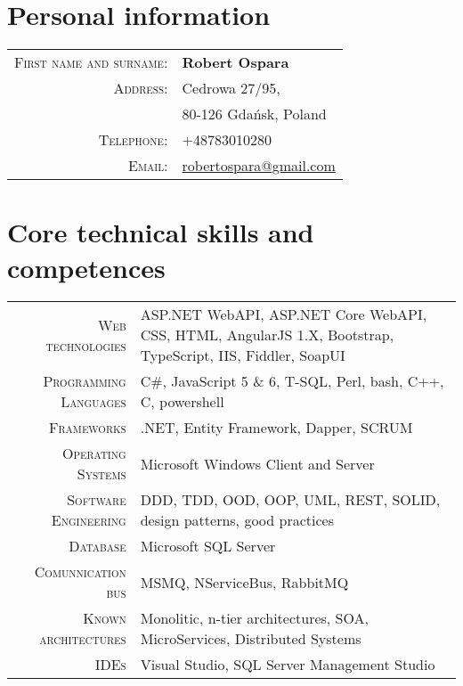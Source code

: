 \documentclass[a4paper,12pt]{article}
\begin{document}
\mbox{}
\par{\bigskip\par}

\section{Personal information}

\begin{tabular}{rl}
	\textsc{First name and surname:}&  \textbf{Robert Ospara} \\
	\textsc{Address:}& Cedrowa 27/95, \\
	\textsc{}& 80-126 Gdańsk, Poland \\
	\textsc{Telephone:}& +48783010280 \\
	\textsc{Email:}& \href{mailto:robertospara@gmail.com}{robertospara@gmail.com}
\end{tabular}

\vspace{2em}

\section{Core technical skills and competences}
\begin{tabular}{r|p{9.5cm}}
	\textsc{Web technologies}
	&\footnotesize{ASP.NET WebAPI, ASP.NET Core WebAPI, CSS, HTML, AngularJS 1.X, Bootstrap, TypeScript, IIS, Fiddler, SoapUI} \\
	\textsc{Programming Languages}
	&\footnotesize{C\#, JavaScript 5 \& 6, T-SQL, Perl, bash, C++, C, powershell} \\
	\textsc{Frameworks}
	&\footnotesize{.NET, Entity Framework, Dapper, SCRUM} \\
	\textsc{Operating Systems}
	&\footnotesize{Microsoft Windows Client and Server} \\
	\textsc{Software Engineering}
	&\footnotesize{DDD, TDD, OOD, OOP, UML, REST, SOLID, design patterns, good practices} \\
	\textsc{Database}
	&\footnotesize{Microsoft SQL Server} \\
	\textsc{Comunnication bus}
	&\footnotesize{MSMQ, NServiceBus, RabbitMQ} \\
	\textsc{Known architectures}
	&\footnotesize{Monolitic, n-tier architectures, SOA, MicroServices, Distributed Systems} \\
	\textsc{IDEs}
	&\footnotesize{Visual Studio, SQL Server Management Studio} \\
\end{tabular}
\end{document}
